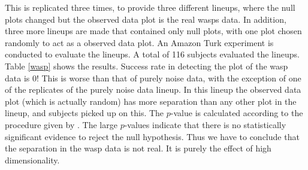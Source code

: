 This is replicated three times, to provide three different lineups, where the null plots changed but the observed data plot is the real wasps data. In addition, three more lineups are made that contained only null plots, with one plot chosen randomly to act as a observed data plot. An Amazon Turk experiment is conducted to evaluate the lineups.  A total of 116 subjects evaluated the lineups. Table \ref{wasp} shows the results. Success rate in detecting the plot of the wasp data is 0! This is worse than that of purely noise data, with the exception of one of the replicates of the purely noise data lineup. In this lineup the observed data plot (which is actually random) has more separation than any other plot in the lineup, and subjects picked up on this. The $p$-value is calculated according to the procedure given by \cite{majumder:2011}. The large $p$-values indicate that there is no statistically significant evidence to reject the null hypothesis. Thus we have to conclude that the separation in the wasp data is not real. It is purely the effect of high dimensionality. 






